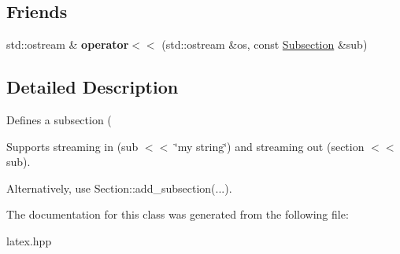 \subsection*{Friends}
\begin{DoxyCompactItemize}
\item 
\hypertarget{classlatex_1_1doc_1_1Subsection_a6fae88d1537df6d93767459f4c918fe2}{std\-::ostream \& {\bfseries operator$<$$<$} (std\-::ostream \&os, const \hyperlink{classlatex_1_1doc_1_1Subsection}{Subsection} \&sub)}\label{classlatex_1_1doc_1_1Subsection_a6fae88d1537df6d93767459f4c918fe2}

\end{DoxyCompactItemize}


\subsection{Detailed Description}
Defines a subsection (

Supports streaming in (sub $<$$<$ \char`\"{}my string\char`\"{}) and streaming out (section $<$$<$ sub).

Alternatively, use {\ttfamily Section\-::add\-\_\-subsection(...)}. 

The documentation for this class was generated from the following file\-:\begin{DoxyCompactItemize}
\item 
latex.\-hpp\end{DoxyCompactItemize}

